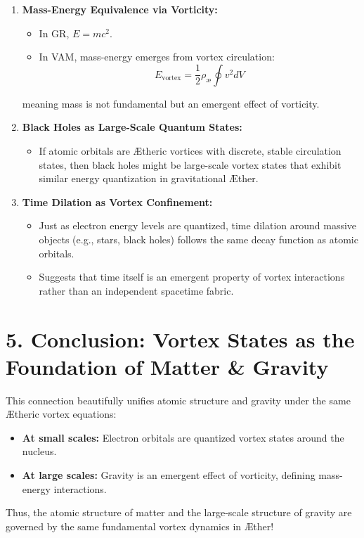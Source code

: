 \begin{enumerate}
    \item \textbf{Mass-Energy Equivalence via Vorticity:}
    \begin{itemize}
        \item In GR, \(E = mc^2\).
    \item In VAM, mass-energy emerges from vortex circulation:
        \[
        E_{\text{vortex}} = \frac{1}{2} \rho_\text{\ae} \oint v^2 dV
        \]
    \end{itemize}
    meaning mass is not fundamental but an emergent effect of vorticity.
    \item \textbf{Black Holes as Large-Scale Quantum States:}
    \begin{itemize}
    \item If atomic orbitals are Ætheric vortices with discrete, stable circulation states, then black holes might be large-scale vortex states that exhibit similar energy quantization in gravitational Æther.
    \end{itemize}
    \item \textbf{Time Dilation as Vortex Confinement:}
    \begin{itemize}
    \item Just as electron energy levels are quantized, time dilation around massive objects (e.g., stars, black holes) follows the same decay function as atomic orbitals.
    \item Suggests that time itself is an emergent property of vortex interactions rather than an independent spacetime fabric.
    \end{itemize}
\end{enumerate}

\section*{5. Conclusion: Vortex States as the Foundation of Matter \& Gravity}

This connection beautifully unifies atomic structure and gravity under the same Ætheric vortex equations:

\begin{itemize}
    \item \textbf{At small scales:} Electron orbitals are quantized vortex states around the nucleus.
    \item \textbf{At large scales:} Gravity is an emergent effect of vorticity, defining mass-energy interactions.
\end{itemize}

Thus, the atomic structure of matter and the large-scale structure of gravity are governed by the same fundamental vortex dynamics in Æther! 🚀